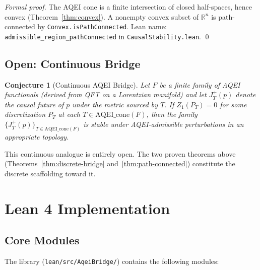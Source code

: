 \documentclass[12pt]{article}
\newtheorem{conjecture}[theorem]{Conjecture}
\begin{document}
\begin{proof}[Formal proof]
The AQEI cone is a finite intersection of closed half-spaces, hence convex
(Theorem~\ref{thm:convex}).  A nonempty convex subset of
$\mathbb{R}^n$ is path-connected by \texttt{Convex.isPathConnected}.
Lean name: \texttt{admissible\_region\_pathConnected} in
\texttt{CausalStability.lean}. \qed
\end{proof}

\subsection{Open: Continuous Bridge}

\begin{conjecture}[Continuous AQEI Bridge]\label{conj:continuous}
Let $F$ be a finite family of AQEI functionals (derived from QFT on a
Lorentzian manifold) and let $J^+_T(p)$ denote the causal future of
$p$ under the metric sourced by $T$.  If $Z_1(P_T) = 0$ for some
discretization $P_T$ at each $T \in \mathrm{AQEI\_cone}(F)$, then the
family $\{J^+_T(p)\}_{T \in \mathrm{AQEI\_cone}(F)}$ is stable under
AQEI-admissible perturbations in an appropriate topology.
\end{conjecture}

\noindent
This continuous analogue is entirely open.  The two proven theorems above
(Theorems~\ref{thm:discrete-bridge} and~\ref{thm:path-connected})
constitute the discrete scaffolding toward it.

\section{Lean 4 Implementation}

\subsection{Core Modules}

The library (\texttt{lean/src/AqeiBridge/}) contains the following modules:
\end{document}
